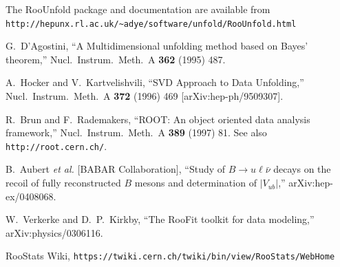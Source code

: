 \documentclass{desyproc}
\begin{document}
\begin{footnotesize}

\begin{thebibliography}{99}

  The RooUnfold package and documentation are available from\\
  \verb=http://hepunx.rl.ac.uk/~adye/software/unfold/RooUnfold.html=

  G.~D'Agostini,
  ``A Multidimensional unfolding method based on Bayes' theorem,''
  Nucl.\ Instrum.\ Meth.\  A {\bf 362} (1995) 487.

  A.~Hocker and V.~Kartvelishvili,
  ``SVD Approach to Data Unfolding,''
  Nucl.\ Instrum.\ Meth.\  A {\bf 372} (1996) 469
  [arXiv:hep-ph/9509307].

  R.~Brun and F.~Rademakers,
  ``ROOT: An object oriented data analysis framework,''
  Nucl.\ Instrum.\ Meth.\  A {\bf 389} (1997) 81.
  See also \verb=http://root.cern.ch/=.

  B.~Aubert {\it et al.}  [BABAR Collaboration],
  ``Study of $B \to u \ell \bar{\nu}$ decays on the recoil of fully reconstructed $B$ mesons and determination of $|V_{ub}|$,''
  arXiv:hep-ex/0408068.

  W.~Verkerke and D.~P.~Kirkby,
  ``The RooFit toolkit for data modeling,''
  arXiv:physics/0306116.

  RooStats Wiki,
  \verb=https://twiki.cern.ch/twiki/bin/view/RooStats/WebHome=

\end{thebibliography}

\end{footnotesize}

\end{document}
